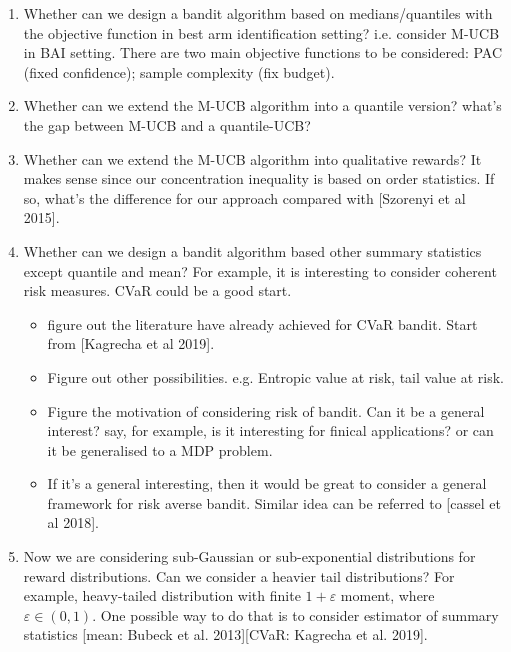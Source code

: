 \begin{enumerate}
    \item Whether can we design a bandit algorithm based on medians/quantiles with the objective function in best arm identification setting? i.e. consider M-UCB in BAI setting. There are two main objective functions to be considered: PAC (fixed confidence); sample complexity (fix budget). 
    
    \item Whether can we extend the M-UCB algorithm into a quantile version? what's the gap between M-UCB and a quantile-UCB?
    
    \item Whether can we extend the M-UCB algorithm into qualitative rewards? It makes sense since our concentration inequality is based on order statistics. If so, what's the difference for our approach compared with [Szorenyi et al 2015]. 
    
    \item Whether can we design a bandit algorithm based other summary statistics except quantile and mean? For example, it is interesting to consider coherent risk measures. CVaR could be a good start.
        \begin{itemize}
            \item figure out the literature have already achieved for CVaR bandit. Start from [Kagrecha et al 2019].
            \item Figure out other possibilities. e.g. Entropic value at risk, tail value at risk. 
            \item Figure the motivation of considering risk of bandit. Can it be a general interest? say, for example, is it interesting for finical applications? or can it be generalised to a MDP problem. 
            \item If it's a general interesting, then it would be great to consider a general framework for risk averse bandit. Similar idea can be referred to [cassel et al 2018].
        \end{itemize}
        
    \item Now we are considering sub-Gaussian or sub-exponential distributions for reward distributions. Can we consider a heavier tail distributions? For example, heavy-tailed distribution with finite $1 + \varepsilon$ moment, where $\varepsilon \in (0,1)$. One possible way to do that is to consider estimator of summary statistics [mean: Bubeck et al. 2013][CVaR: Kagrecha et al. 2019].
    

\end{enumerate}
